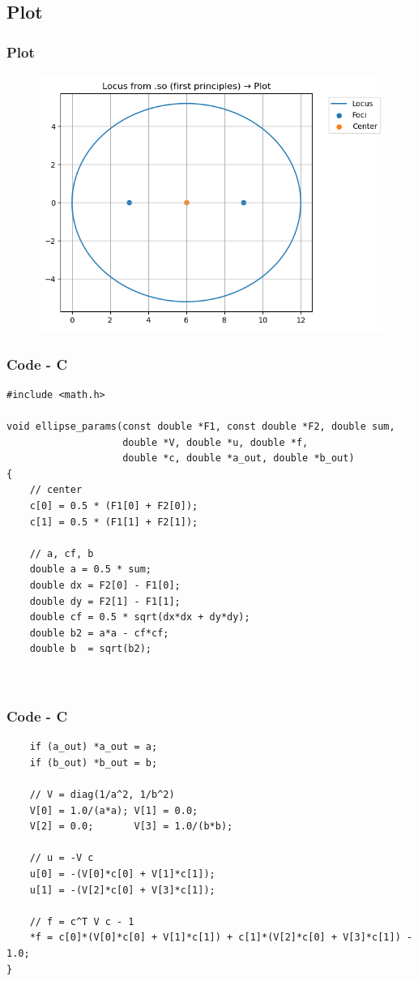 \documentclass{beamer}
\theoremstyle{remark}
\numberwithin{equation}{section}
\begin{document}
\subsection{Plot}
\begin{frame}
    \frametitle{Plot}
\begin{figure}[H]
   \centering
   \includegraphics[width=0.8\columnwidth]{figs/ellipse.png}
   \caption{}
   \label{}
   \end{figure}
\end{frame}

\begin{frame}[fragile]
    \frametitle{Code - C}
    \begin{lstlisting}
#include <math.h>

void ellipse_params(const double *F1, const double *F2, double sum,
                    double *V, double *u, double *f,
                    double *c, double *a_out, double *b_out)
{
    // center
    c[0] = 0.5 * (F1[0] + F2[0]);
    c[1] = 0.5 * (F1[1] + F2[1]);

    // a, cf, b
    double a = 0.5 * sum;
    double dx = F2[0] - F1[0];
    double dy = F2[1] - F1[1];
    double cf = 0.5 * sqrt(dx*dx + dy*dy);
    double b2 = a*a - cf*cf;
    double b  = sqrt(b2);



    \end{lstlisting}
    \end{frame}

    \begin{frame}[fragile]
    \frametitle{Code - C}
    \begin{lstlisting}
    if (a_out) *a_out = a;
    if (b_out) *b_out = b;

    // V = diag(1/a^2, 1/b^2)
    V[0] = 1.0/(a*a); V[1] = 0.0;
    V[2] = 0.0;       V[3] = 1.0/(b*b);

    // u = -V c
    u[0] = -(V[0]*c[0] + V[1]*c[1]);
    u[1] = -(V[2]*c[0] + V[3]*c[1]);

    // f = c^T V c - 1
    *f = c[0]*(V[0]*c[0] + V[1]*c[1]) + c[1]*(V[2]*c[0] + V[3]*c[1]) - 1.0;
}

    \end{lstlisting}
    \end{frame}
\end{document}
